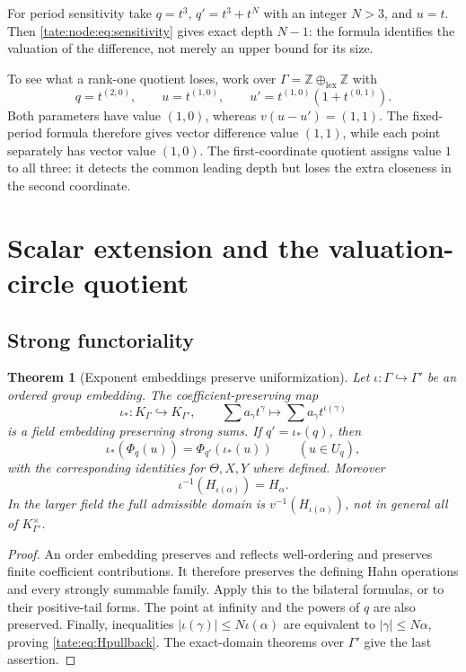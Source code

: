 \documentclass[11pt,letterpaper]{article}
\newtheorem{theorem}{Theorem}[section]
\theoremstyle{definition}
\newcommand{\Z}{\mathbb Z}
\begin{document}
For period sensitivity take $q=t^3$, $q'=t^3+t^N$ with an integer $N>3$,
and $u=t$. Then \eqref{tate:node:eq:sensitivity} gives exact depth $N-1$:
the formula identifies the valuation of the difference, not merely an upper
bound for its size.

To see what a rank-one quotient loses, work over
$\Gamma=\Z\oplus_{\mathrm{lex}}\Z$ with
\[
 q=t^{(2,0)},\qquad u=t^{(1,0)},\qquad
 u'=t^{(1,0)}(1+t^{(0,1)}).
\]
Both parameters have value $(1,0)$, whereas $v(u-u')=(1,1)$.
The fixed-period formula therefore gives vector difference value $(1,1)$,
while each point separately has vector value $(1,0)$. The first-coordinate
quotient assigns value $1$ to all three: it detects the common leading
depth but loses the extra closeness in the second coordinate.

\section{Scalar extension and the valuation-circle quotient}\label{tate:sec:extension}

\subsection{Strong functoriality}

\begin{theorem}[Exponent embeddings preserve uniformization]\label{tate:thm:extension}
Let $\iota:\Gamma\hookrightarrow\Gamma'$ be an ordered group embedding.
The coefficient-preserving map
\[
 \iota_*:K_\Gamma\hookrightarrow K_{\Gamma'},\qquad
 \sum a_\gamma t^\gamma\longmapsto\sum a_\gamma t^{\iota(\gamma)}
\]
is a field embedding preserving strong sums. If $q'=\iota_*(q)$, then
\begin{equation}
 \iota_*(\Phi_q(u))=\Phi_{q'}(\iota_*(u))\qquad(u\in U_q),
 \label{tate:eq:functorial}
\end{equation}
with the corresponding identities for $\Theta,X,Y$ where defined.
Moreover
\begin{equation}
 \iota^{-1}(H_{\iota(\alpha)})=H_\alpha.\label{tate:eq:Hpullback}
\end{equation}
In the larger field the full admissible domain is
$v^{-1}(H_{\iota(\alpha)})$, not in general all of $K_{\Gamma'}^\times$.
\end{theorem}

\begin{proof}
An order embedding preserves and reflects well-ordering and preserves
finite coefficient contributions. It therefore preserves the defining
Hahn operations and every strongly summable family. Apply this to the
bilateral formulas, or to their positive-tail forms. The point at
infinity and the powers of $q$ are also preserved. Finally, inequalities
$|\iota(\gamma)|\le N\iota(\alpha)$ are equivalent to
$|\gamma|\le N\alpha$, proving \eqref{tate:eq:Hpullback}. The exact-domain
theorems over $\Gamma'$ give the last assertion.
\end{proof}
\end{document}
